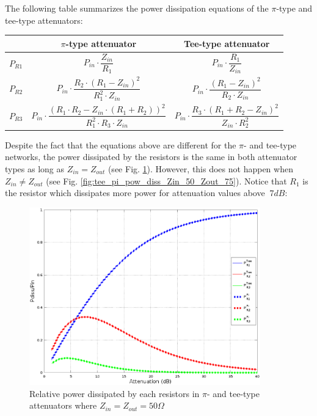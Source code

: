 \noindent The following table summarizes the power dissipation equations of the $\pi$-type and  tee-type attenuators:

\begin{center}
\begin{tabular}{| c | c | c| }
\hline 
 & \textbf{$\pi$-type attenuator} & \textbf{Tee-type attenuator} \\ \hline                        
$P_{R1}$ & $ P_{in}\cdot \dfrac{Z_{in}}{R_1}$ &  $ P_{in}\cdot \dfrac{R_1}{Z_{in}}$ \\ \hline  
$P_{R2}$ & $P_{in}\cdot \dfrac{R_2 \cdot (R_1 - Z_{in})^2}{R_1^2 \cdot Z_{in}}$ & $P_{in}\cdot \dfrac{ (R_1 - Z_{in})^2}{R_2 \cdot Z_{in}}$ \\ \hline  
$P_{R3}$ & $P_{in} \cdot \dfrac{(R_1 \cdot R_2 - Z_{in} \cdot (R_1 + R_2))^2}{R_1^2 \cdot R_3 \cdot Z_{in}}$ & $P_{in} \cdot \dfrac{R_3 \cdot (R_1 + R_2 - Z_{in})^2}{Z_{in} \cdot R_2^2}$  \\   
\hline  
\end{tabular}
\end{center}

\noindent Despite the fact that the equations above are different for the $\pi$- and tee-type networks, the power dissipated by the resistors is the same in both attenuator types as long as $Z_{in} = Z_{out}$ (see Fig. \ref{fig:tee_pi_pow_diss_Zin_Zout_Z0}). However, this does not happen when $Z_{in} \neq Z_{out}$ (see Fig. \ref{fig:tee_pi_pow_diss_Zin_50_Zout_75}). Notice that $R_{1}$ is the resistor which dissipates more power for attenuation values above $~7dB$:

\begin{figure}[ht]
\begin{center}
\includegraphics[width=10cm]{bitmaps/synthesis/attenuators/Relative-dissipated-power-pi-tee-Zin-Zout-Z0}
\end{center}
\caption{Relative power dissipated by each resistors in $\pi$- and tee-type attenuators where $Z_{in} = Z_{out} = 50 \Omega$}
\label{fig:tee_pi_pow_diss_Zin_Zout_Z0}
\end{figure}
\FloatBarrier

